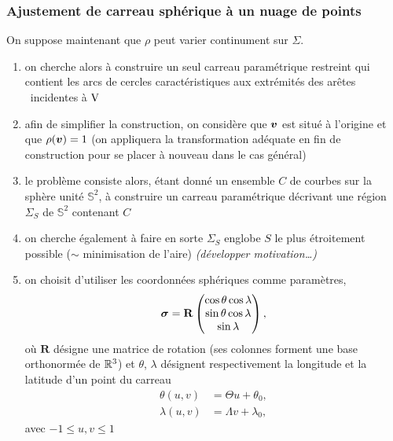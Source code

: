 \subsubsection{Ajustement de carreau sphérique à un nuage de points}
\label{section:ajustement_carreau_spherique}
\def\s{\vit{s}}
On suppose maintenant que $\rho$ peut varier continument sur $\Sigma$. 

\begin{enumerate}
	\item on cherche alors à construire un seul carreau paramétrique restreint qui contient les arcs de cercles caractéristiques aux extrémités des arêtes \brep\ incidentes à $\mathrm{V}$
	\item afin de simplifier la construction, on considère que $\bm{v}$ est situé à l'origine et que $\rho(\bm{v}) = 1$ (on appliquera la transformation adéquate en fin de construction pour se placer à nouveau dans le cas général)
	\item le problème consiste alors, étant donné un ensemble $C$ de courbes sur la sphère unité $\mathbb{S}^2$, à construire un carreau paramétrique décrivant une région $\Sigma_S$ de $\mathbb{S}^2$ contenant $C$
	\item on cherche également à faire en sorte $\Sigma_S$ englobe $S$ le plus étroitement possible ($\sim$ minimisation de l'aire) \textit{(développer motivation\ldots)}
	
	\item on choisit d'utiliser les coordonnées sphériques comme paramètres, \ie
	\begin{equation}
	    \bm{\sigma} = \mathbf{R} 
	    \begin{pmatrix}
		    \cos \theta \cos \lambda \\
		    \sin \theta \cos \lambda \\
		    \sin \lambda \\
	    \end{pmatrix},
	\end{equation}
	où $\mathbf{R}$ désigne une matrice de rotation (\ie ses colonnes forment une base orthonormée de $\mathbb{R}^3$) et $\theta$, $\lambda$ désignent respectivement la longitude et la latitude d'un point du carreau
	\begin{align*}
	    \theta(u,v)  &= \Theta u + \theta_0, \\
	    \lambda(u,v) &= \Lambda v + \lambda_0,
	\end{align*}
	avec $-1 \leq u, v \leq 1$
	\end{enumerate}

